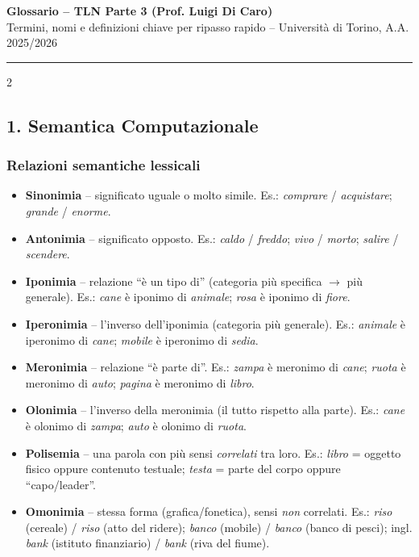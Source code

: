 \documentclass[10pt,a4paper]{extarticle}
\begin{document}
\begin{center}
{\Large\textbf{Glossario -- TLN Parte 3 (Prof. Luigi Di Caro)}}\\[2pt]
{\small Termini, nomi e definizioni chiave per ripasso rapido -- Universit\`a di Torino, A.A. 2025/2026}
\end{center}
\vspace{4pt}
\hrule
\vspace{6pt}

\begin{multicols}{2}

\subsection*{1. Semantica Computazionale}
\subsubsection*{Relazioni semantiche lessicali}
\begin{itemize}
\item \textbf{Sinonimia} -- significato uguale o molto simile. Es.: \emph{comprare} / \emph{acquistare}; \emph{grande} / \emph{enorme}.
\item \textbf{Antonimia} -- significato opposto. Es.: \emph{caldo} / \emph{freddo}; \emph{vivo} / \emph{morto}; \emph{salire} / \emph{scendere}.
\item \textbf{Iponimia} -- relazione ``\`e un tipo di'' (categoria pi\`u specifica $\to$ pi\`u generale). Es.: \emph{cane} \`e iponimo di \emph{animale}; \emph{rosa} \`e iponimo di \emph{fiore}.
\item \textbf{Iperonimia} -- l'inverso dell'iponimia (categoria pi\`u generale). Es.: \emph{animale} \`e iperonimo di \emph{cane}; \emph{mobile} \`e iperonimo di \emph{sedia}.
\item \textbf{Meronimia} -- relazione ``\`e parte di''. Es.: \emph{zampa} \`e meronimo di \emph{cane}; \emph{ruota} \`e meronimo di \emph{auto}; \emph{pagina} \`e meronimo di \emph{libro}.
\item \textbf{Olonimia} -- l'inverso della meronimia (il tutto rispetto alla parte). Es.: \emph{cane} \`e olonimo di \emph{zampa}; \emph{auto} \`e olonimo di \emph{ruota}.
\item \textbf{Polisemia} -- una parola con pi\`u sensi \emph{correlati} tra loro. Es.: \emph{libro} = oggetto fisico oppure contenuto testuale; \emph{testa} = parte del corpo oppure ``capo/leader''.
\item \textbf{Omonimia} -- stessa forma (grafica/fonetica), sensi \emph{non} correlati. Es.: \emph{riso} (cereale) / \emph{riso} (atto del ridere); \emph{banco} (mobile) / \emph{banco} (banco di pesci); ingl. \emph{bank} (istituto finanziario) / \emph{bank} (riva del fiume).

\end{itemize}
\end{multicols}
\end{document}
